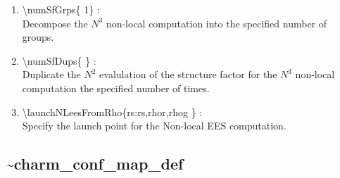 \documentclass[12pt,titlepage]{article}
\begin{document}
\begin{enumerate}
  \vspace{0.15in} 
  \item \textbackslash{}numSfGrps\{ 1\} : \\    
  Decompose the $N^3$ non-local computation into the specified number of groups.
  \vspace{0.15in} 
  \item \textbackslash{}numSfDups\{ \} : \\    
  Duplicate the $N^2$ evalulation of the structure factor for the
  $N^3$ non-local computation the specified number of times.
  \vspace{0.15in} 
  \item \textbackslash{}launchNLeesFromRho\{rs:rs,rhor,rhog \} : \\  
  Specify the launch point for the Non-local EES computation.
\end{enumerate}

\newpage
\subsection*{\bf \~{ }charm\_conf\_map\_def}
\end{document}
